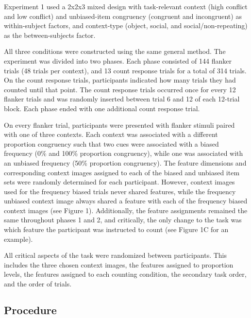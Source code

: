 \documentclass[english,,man,floatsintext]{apa6}
\begin{document}
Experiment 1 used a 2x2x3 mixed design with task-relevant context (high conflict and low conflict) and unbiased-item congruency (congruent and incongruent) as within-subject factors, and context-type (object, social, and social/non-repeating) as the between-subjects factor.

All three conditions were constructed using the same general method. The experiment was divided into two phases. Each phase consisted of 144 flanker trials (48 trials per context), and 13 count response trials for a total of 314 trials. On the count response trials, participants indicated how many trials they had counted until that point. The count response trials occurred once for every 12 flanker trials and was randomly inserted between trial 6 and 12 of each 12-trial block. Each phase ended with one additional count response trial.

On every flanker trial, participants were presented with flanker stimuli paired with one of three contexts. Each context was associated with a different proportion congruency such that two cues were associated with a biased frequency (0\% and 100\% proportion congruency), while one was associated with an unbiased frequency (50\% proportion congruency). The feature dimensions and corresponding context images assigned to each of the biased and unbiased item sets were randomly determined for each participant. However, context images used for the frequency biased trials never shared features, while the frequency unbiased context image always shared a feature with each of the frequency biased context images (see Figure 1). Additionally, the feature assignments remained the same throughout phases 1 and 2, and critically, the only change to the task was which feature the participant was instructed to count (see Figure 1C for an example).

All critical aspects of the task were randomized between participants. This includes the three chosen context images, the features assigned to proportion levels, the features assigned to each counting condition, the secondary task order, and the order of trials.

\hypertarget{procedure}{%
\subsection{Procedure}\label{procedure}}
\end{document}
